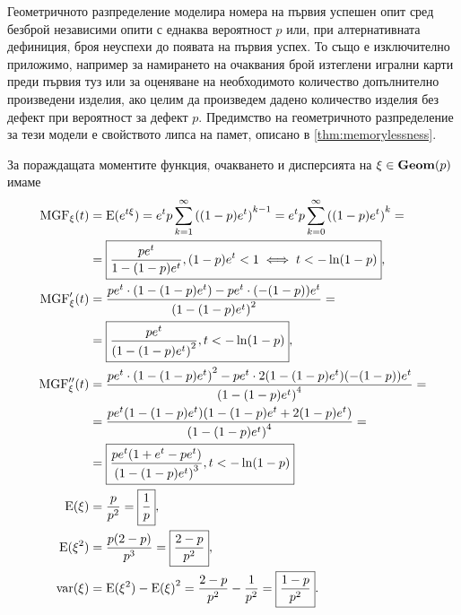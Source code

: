\documentclass{../../common/topic}
\begin{document}
Геометричното разпределение моделира номера на първия успешен опит сред безброй независими опити с еднаква вероятност \( p \) или, при алтернативната дефиниция, броя неуспехи до появата на първия успех. То също е изключително приложимо, например за намирането на очаквания брой изтеглени игрални карти преди първия туз или за оценяване на необходимото количество допълнително произведени изделия, ако целим да произведем дадено количество изделия без дефект при вероятност за дефект \( p \). Предимство на геометричното разпределение за тези модели е свойството липса на памет, описано в \cref{thm:memorylessness}.

За пораждащата моментите функция, очакването и дисперсията на \( \xi \in \operatorname{\mathbf{Geom}}(p) \) имаме
\begingroup
\allowdisplaybreaks
\begin{align*}
  \operatorname{MGF}_\xi(t)
  &=
  \operatorname{E}(e^{t\xi})
  =
  e^t p \sum_{k=1}^\infty {((1-p) e^t)}^{k-1}
  =
  e^t p \sum_{k=0}^\infty {((1-p) e^t)}^k
  = \\ &=
  \boxed{\frac {p e^t} {1 - (1-p) e^t}, (1-p) e^t < 1 \iff t < -\ln(1-p)},
  \\
  \operatorname{MGF}'_\xi(t)
  &=
  \frac {p e^t \cdot (1 - (1-p) e^t) - p e^t \cdot (-(1-p)) e^t} {{(1 - (1-p) e^t)}^2}
  = \\ &=
  \boxed{\frac {p e^t} {{(1 - (1-p) e^t)}^2}, t < -\ln(1-p)},
  \\
  \operatorname{MGF}''_\xi(t)
  &=
  \frac {p e^t \cdot {(1 - (1-p) e^t)}^2 - p e^t \cdot 2 (1 - (1-p) e^t) (-(1-p)) e^t} {{(1 - (1-p) e^t)}^4}
  = \\ &=
  \frac {p e^t (1 - (1-p) e^t) (1 - (1-p) e^t + 2 (1-p) e^t)} {{(1 - (1-p) e^t)}^4}
  = \\ &=
  \boxed{\frac {p e^t (1 + e^t - p e^t)} {{(1 - (1-p) e^t)}^3}, t < -\ln(1-p)}
  \\
  \operatorname{E}(\xi)
  &=
  \frac p {p^2}
  =
  \boxed{\frac 1 p},
  \\
  \operatorname{E}(\xi^2)
  &=
  \frac {p(2-p)} {p^3}
  =
  \boxed{\frac {2-p} {p^2}},
  \\
  \operatorname{var}(\xi)
  &=
  \operatorname{E}(\xi^2) - {\operatorname{E}(\xi)}^2
  =
  \frac {2-p} {p^2} - \frac 1 {p^2}
  =
  \boxed{\frac {1-p} {p^2}}.
\end{align*}
\endgroup
\end{document}
